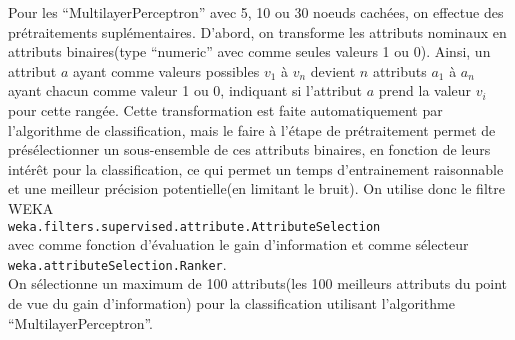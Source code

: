 \documentclass[11pt]{article} %
\begin{document}
Pour les ``MultilayerPerceptron'' avec 5, 10 ou 30 noeuds cachées, on effectue des prétraitements suplémentaires.
D'abord, on transforme les attributs nominaux en attributs binaires(type ``numeric'' avec comme seules valeurs 1 ou 0).
Ainsi, un attribut $a$ ayant comme valeurs possibles $v_1$ à $v_n$ devient $n$ attributs $a_1$ à $a_n$ ayant chacun comme valeur 1 ou 0, 
indiquant si l'attribut $a$ prend la valeur $v_i$ pour cette rangée.
Cette transformation est faite automatiquement par l'algorithme de classification, mais le faire à l'étape de prétraitement
permet de présélectionner un sous-ensemble de ces attributs binaires, en fonction de leurs intérêt pour la classification, ce qui permet
un temps d'entrainement raisonnable et une meilleur précision potentielle(en limitant le bruit).
On utilise donc le filtre WEKA \\
\texttt{weka.filters.supervised.attribute.AttributeSelection} \\
avec comme fonction d'évaluation le gain d'information et comme sélecteur \\
\texttt{weka.attributeSelection.Ranker}. \\
On sélectionne un maximum de 100 attributs(les 100 meilleurs attributs du point de vue du gain d'information) pour la classification utilisant
l'algorithme ``MultilayerPerceptron''.
\end{document}
